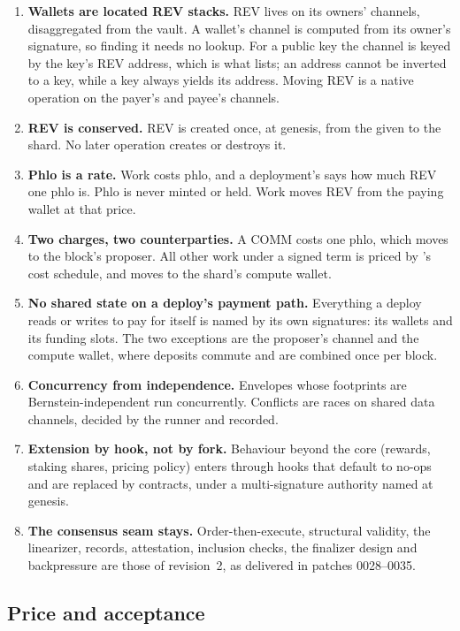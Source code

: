 \documentclass[11pt]{article}
\newcommand{\code}{\path}
\begin{document}
\begin{enumerate}[label=P\arabic*.,leftmargin=2.2em]
\item \textbf{Wallets are located REV stacks.} REV lives on its owners' channels, disaggregated from the vault. A wallet's channel is computed from its owner's signature, so finding it needs no lookup. For a public key the channel is keyed by the key's REV address, which is what \code{wallets.txt} lists; an address cannot be inverted to a key, while a key always yields its address. Moving REV is a native operation on the payer's and payee's channels.
\item \textbf{REV is conserved.} REV is created once, at genesis, from the \code{wallets.txt} given to the shard. No later operation creates or destroys it.
\item \textbf{Phlo is a rate.} Work costs phlo, and a deployment's \code{phloPrice} says how much REV one phlo is. Phlo is never minted or held. Work moves REV from the paying wallet at that price.
\item \textbf{Two charges, two counterparties.} A COMM costs one phlo, which moves to the block's proposer. All other work under a signed term is priced by \code{dev}'s cost schedule, and moves to the shard's compute wallet.
\item \textbf{No shared state on a deploy's payment path.} Everything a deploy reads or writes to pay for itself is named by its own signatures: its wallets and its funding slots. The two exceptions are the proposer's channel and the compute wallet, where deposits commute and are combined once per block.
\item \textbf{Concurrency from independence.} Envelopes whose footprints are Bernstein-independent run concurrently. Conflicts are races on shared data channels, decided by the runner and recorded.
\item \textbf{Extension by hook, not by fork.} Behaviour beyond the core (rewards, staking shares, pricing policy) enters through hooks that default to no-ops and are replaced by contracts, under a multi-signature authority named at genesis.
\item \textbf{The consensus seam stays.} Order-then-execute, structural validity, the linearizer, records, attestation, inclusion checks, the finalizer design and backpressure are those of revision~2, as delivered in patches 0028--0035.
\end{enumerate}

\subsection{Price and acceptance}
\end{document}
